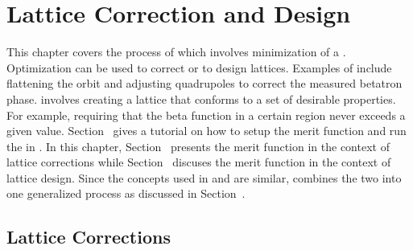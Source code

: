 \chapter{Lattice Correction and Design}
\label{c:opti}

This chapter covers the process of  which involves minimization of a
. Optimization can be used to correct or to design lattices. Examples of  include flattening the orbit and adjusting quadrupoles to correct the
measured betatron phase.  involves creating a lattice that conforms to
a set of desirable properties. For example, requiring that the beta function in a certain
region never exceeds a given value.  Section~ gives a tutorial on how to
setup the merit function and run the  in \tao.  In this chapter,
Section~ presents the merit function in the context of lattice
corrections while Section~ discuses the merit function in the
context of lattice design. Since the concepts used in  and
 are similar, \tao combines the two into one generalized process as
discussed in Section~.

\section{Lattice Corrections}
\label{s:lattice.correction}

